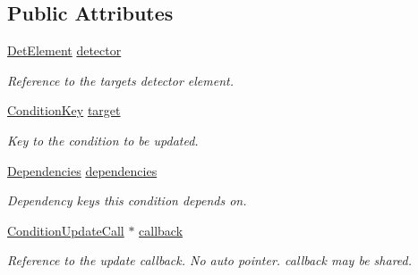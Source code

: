 \subsection*{Public Attributes}
\begin{DoxyCompactItemize}
\item 
\hyperlink{class_d_d4hep_1_1_conditions_1_1_condition_dependency_a0a9ea458cf85d1d76dec51d85830f738}{Det\+Element} \hyperlink{class_d_d4hep_1_1_conditions_1_1_condition_dependency_a967bc771b0504b80f8ecfa879e03e498}{detector}
\begin{DoxyCompactList}\small\item\em Reference to the target\textquotesingle{}s detector element. \end{DoxyCompactList}\item 
\hyperlink{class_d_d4hep_1_1_conditions_1_1_condition_key}{Condition\+Key} \hyperlink{class_d_d4hep_1_1_conditions_1_1_condition_dependency_a1a6c5ef0f44fa4c97fda1f750dd81dc2}{target}
\begin{DoxyCompactList}\small\item\em Key to the condition to be updated. \end{DoxyCompactList}\item 
\hyperlink{class_d_d4hep_1_1_conditions_1_1_condition_dependency_af1594501f40e514c5748092b94e4fd84}{Dependencies} \hyperlink{class_d_d4hep_1_1_conditions_1_1_condition_dependency_ac90a62165ff00d712a03d48716521c51}{dependencies}
\begin{DoxyCompactList}\small\item\em Dependency keys this condition depends on. \end{DoxyCompactList}\item 
\hyperlink{class_d_d4hep_1_1_conditions_1_1_condition_update_call}{Condition\+Update\+Call} $\ast$ \hyperlink{class_d_d4hep_1_1_conditions_1_1_condition_dependency_aa90b6ad647f576574502b6c023b88372}{callback}
\begin{DoxyCompactList}\small\item\em Reference to the update callback. No auto pointer. callback may be shared. \end{DoxyCompactList}\end{DoxyCompactItemize}

